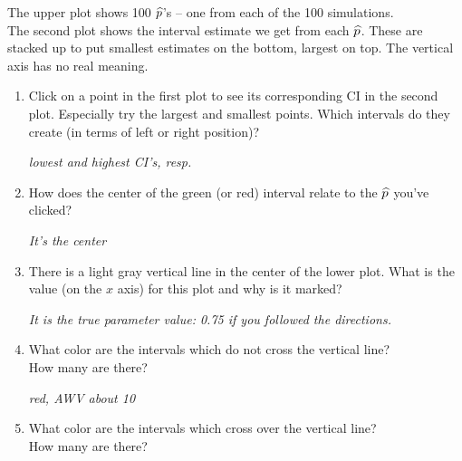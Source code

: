   The upper plot shows 100  $\widehat{p}$'s -- one from each of the 100 simulations.
  \\
  The second plot shows the interval estimate we get from each
  $\widehat{p}$.  These  are stacked up to put smallest estimates on the
  bottom, largest on top. The vertical axis has no real meaning. 

  \begin{enumerate}
      \item   Click on a point in the first plot to see its corresponding CI in
  the second plot.  Especially try the largest and smallest points.
  Which intervals do they create (in terms of left or right position)?
\begin{students}
  \vspace{1cm}
\end{students}
\begin{key}
  {\it lowest and highest CI's, resp.}
\end{key}
\item How does the center of the green (or red)  interval relate to the $\widehat{p}$
  you've clicked?  
\begin{students}
  \vspace{1cm}
\end{students}
\begin{key}
  {\it It's the center}
\end{key}
\item There is a light gray vertical line in the center of the lower
  plot. What is the value (on the $x$ axis) for this plot and why is
  it marked?
\begin{students}
  \vspace{1cm}
\end{students}
\begin{key}
  {\it It is the true parameter value: 0.75 if you followed the directions.}
\end{key}
\item What color are the intervals which do not cross the vertical
  line? \\How many are there?
\begin{students}
  \vspace{1cm}
\end{students}

\begin{key}
  {\it red, AWV about 10}
\end{key}

\item What color are the intervals which cross over the vertical
  line? \\How many are there?
\begin{students}
  \vspace{1cm}
\end{students}


\end{enumerate}

